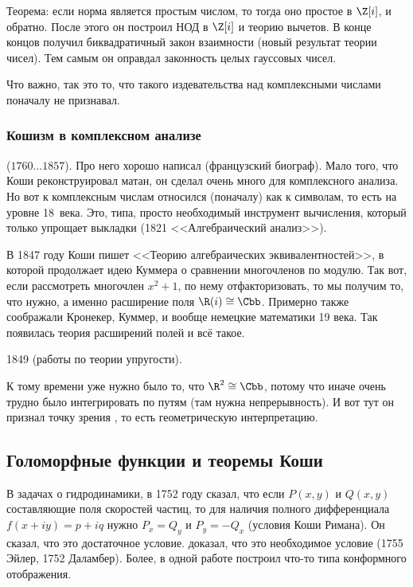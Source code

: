 \documentclass[a4paper,oneside,fleqn,10pt]{article}
\newcommand{\pe}[2]{${#1}\ldots{#2}$}
\begin{document}
Теорема: если норма является простым числом, то тогда оно простое в
$\Z[i]$, и обратно.    После
этого он построил НОД в $\Z[i]$ и теорию вычетов. В конце концов
получил биквадратичный закон взаимности (новый результат теории
чисел).  Тем самым он оправдал законность целых гауссовых чисел.

Что важно, так это то, что  такого издевательства над
комплексными числами поначалу не признавал.

\subsubsection{Кошизм в комплексном анализе}

 (\pe{1760}{1857}).  Про
него хорошо написал 
(французский биограф).  Мало того, что Коши реконструировал матан, он
сделал очень много для комплексного анализа. Но вот к комплексным
числам относился (поначалу) как к символам, то есть на уровне 18~века.
Это, типа, просто необходимый инструмент вычисления, который только
упрощает выкладки (1821 <<Алгебраический анализ>>).

В 1847 году Коши пишет <<Теорию алгебраических эквивалентностей>>, в
которой продолжает идею Куммера о сравнении многочленов по модулю.
Так вот, если рассмотреть многочлен $x^2+1$, по нему отфакторизовать,
то мы получим то, что нужно, а именно расширение поля $\R(i) \cong
\Cbb$.  Примерно также соображали Кронекер, Куммер, и вообще немецкие
математики 19 века. Так появилась теория расширений полей и всё такое.

1849  (работы по теории
упругости).

К тому времени  уже нужно было то, что $\R^2 \cong \Cbb$,
потому что иначе очень трудно было интегрировать по путям (там нужна
непрерывность).  И вот тут он признал точку зрения
, то есть геометрическую интерпретацию.

\subsection{Голоморфные функции и теоремы Коши}

В задачах о гидродинамики, в 1752 году  сказал, что
если $P(x,y)$ и $Q(x,y)$ составляющие поля скоростей частиц, то для
наличия полного дифференциала $f(x + iy) = p + i q$ нужно $P_x = Q_y$
и $P_y = -Q_x$ (условия Коши Римана).  Он сказал, что это достаточное
условие.  доказал, что это необходимое условие (1755
Эйлер, 1752 Даламбер).  Более, в одной работе  построил
что-то типа конформного отображения.
\end{document}
